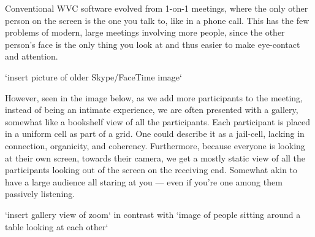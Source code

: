 \documentclass[11pt,letterpaper]{article}
\begin{document}
Conventional WVC software evolved from 1-on-1 meetings, where the only other person on the screen is the one you talk to, like in a phone call. This has the few problems of modern, large meetings involving more people, since the other person’s face is the only thing you look at and thus easier to make eye-contact and attention. 

`insert picture of older Skype/FaceTime image`

However, seen in the image below, as we add more participants to the meeting, instead of being an intimate experience, we are often presented with a gallery, somewhat like a bookshelf view of all the participants. Each participant is placed in a uniform cell as part of a grid. One could describe it as a jail-cell, lacking in connection, organicity, and coherency. Furthermore, because everyone is looking at their own screen, towards their camera, we get a mostly static view of all the participants looking out of the screen on the receiving end. Somewhat akin to have a large audience all staring at you --- even if you’re one among them passively listening.

`insert gallery view of zoom` in contrast with `image of people sitting around a table looking at each other`










\end{document}
